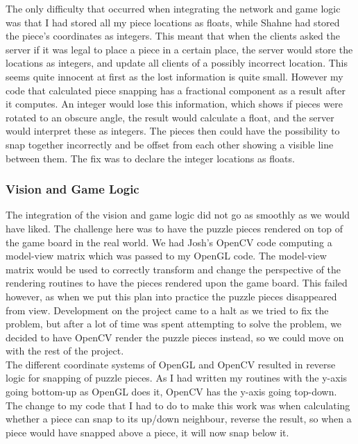 \documentclass{article}
\begin{document}
The only difficulty that occurred when integrating the network and game logic was
that I had stored all my piece locations as floats, while Shahne had stored the
piece's coordinates as integers. This meant that when the clients asked the
server if it was legal to place a piece in a certain place, the server would
store the locations as integers, and update all clients of a possibly incorrect
location. This seems quite innocent at first as the lost information is quite
small. However my code that calculated piece snapping has a fractional component
as a result after it computes. An integer would lose this information, which
shows if pieces were rotated to an obscure angle, the result would calculate a
float, and the server would interpret these as integers. The pieces then could
have the possibility to snap together incorrectly and be offset from each other
showing a visible line between them. The fix was to declare the integer
locations as floats.

\subsubsection{Vision and Game Logic}
The integration of the vision and game logic did not go as smoothly as we would
have liked. The challenge here was to have the puzzle pieces rendered on top of
the game board in the real world. We had Josh's OpenCV code computing a
model-view matrix which was passed to my OpenGL code. The model-view matrix
would be used to correctly transform and change the perspective of the rendering
routines to have the pieces rendered upon the game board. This failed however,
as when we put this plan into practice the puzzle pieces disappeared from
view. Development on the project came to a halt as we tried to fix the problem,
but after a lot of time was spent attempting to solve the problem, we decided to
have OpenCV render the puzzle pieces instead, so we could move on with the rest
of the project.\\

The different coordinate systems of OpenGL and OpenCV resulted in reverse logic
for snapping of puzzle pieces. As I had written my routines with the y-axis
going bottom-up as OpenGL does it, OpenCV has the y-axis going top-down. The
change to my code that I had to do to make this work was when calculating
whether a piece can snap to its up/down neighbour, reverse the result, so when a
piece would have snapped above a piece, it will now snap below it.\\
\end{document}
